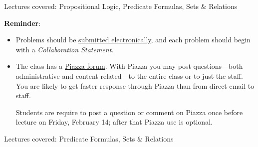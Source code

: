 \documentclass[handout]{mcs}
\begin{document}
\renewcommand{\reading}{ \iffalse
  Part~\bref{part:proofs}{. \emph{Proofs: Introduction}};\fi
\begin{itemize}
\item Chapter~\bref{predicate_sec}{.\ \emph{Predicate Formulas}},
\item Chapter~\bref{data_chap}{.\ \emph{Mathematical Data
Types} through \bref{rel_sec}{.\ \emph{Binary Relations}.}}
\end{itemize}
These assigned readings do \textbf{not}
  include the Problem sections.  (Many of the problems in the text
  will appear as class or homework problems.)}


\begin{staffnotes}
Lectures covered: Propositional Logic, Predicate Formulas, Sets \& Relations
\end{staffnotes}

\medskip

\textbf{Reminder}:

\begin{itemize}

\item Problems should be
  \href{https://stellar.mit.edu/S/course/6/sp14/6.042/courseMaterial/topics/topic2/syllabus/text3/text}
       {submitted electronically}, and each problem should begin with a \emph{Collaboration Statement}.
\iffalse
\href{http://courses.csail.mit.edu/6.042/spring14/submission.shtml#collab-state}
{\emph{collaboration statement}}
\fi

\item The class has a
  \href{http://piazza.com/mit/spring2014/6042j18062j/home} {Piazza
    forum}.  With Piazza you may post questions---both administrative
  and content related---to the entire class or to just the staff.  You
  are likely to get faster response through Piazza than from direct
  email to staff.

Students are require to post a question or comment on Piazza once before lecture on Friday, 
February 14; after that Piazza use is optional.
\end{itemize}

\begin{staffnotes}
Lectures covered: Predicate Formulas, Sets \& Relations
\end{staffnotes}



\end{document}
